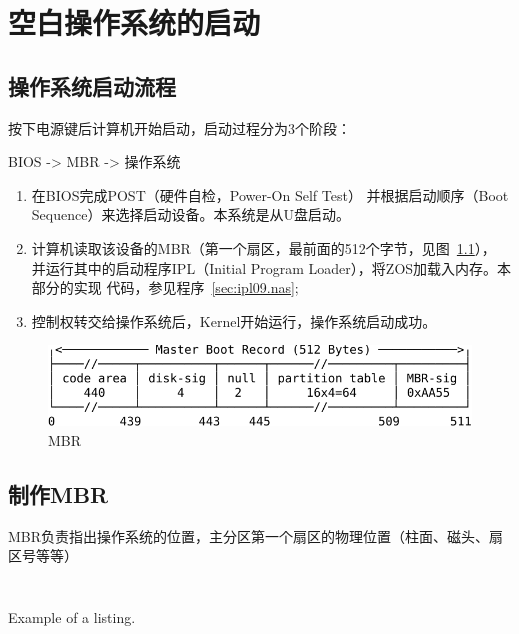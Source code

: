 \chapter{空白操作系统的启动}

\section{操作系统启动流程}

按下电源键后计算机开始启动，启动过程分为3个阶段\cite{hbt}：
\begin{center}BIOS -> MBR -> 操作系统\end{center}

\begin{enumerate}
\item 在BIOS完成POST（硬件自检，Power-On Self Test）
  并根据启动顺序（Boot Sequence）来选择启动设备。本系统是从U盘启动。
\item 计算机读取该设备的MBR（第一个扇区，最前面的512个字节，见图~\ref{fig:mbr}），
  并运行其中的启动程序IPL（Initial Program Loader），将ZOS加载入内存。本部分的实现
  代码，参见程序~\ref{sec:ipl09.nas};
\item 控制权转交给操作系统后，Kernel开始运行，操作系统启动成功。
\end{enumerate}

\begin{figure}
  \centering
  \includegraphics[width=1\textwidth]{fig/mbr.pdf}
  \caption{MBR}
  \label{fig:mbr}
\end{figure}

\section{制作MBR}

MBR负责指出操作系统的位置，主分区第一个扇区的物理位置（柱面、磁头、扇区号等等）

\begin{listing}[H]
  \inputminted[tabsize=2, firstline=6, lastline=6,
  linenos=true]{nasm}{../ZOS/src/kernel/ipl09.nas}
  \inputminted[tabsize=2, firstline=12, lastline=29,
  linenos=true]{nasm}{../ZOS/src/kernel/ipl09.nas}
  \caption{Example of a listing.}
  \label{lst:example}
\end{listing}


